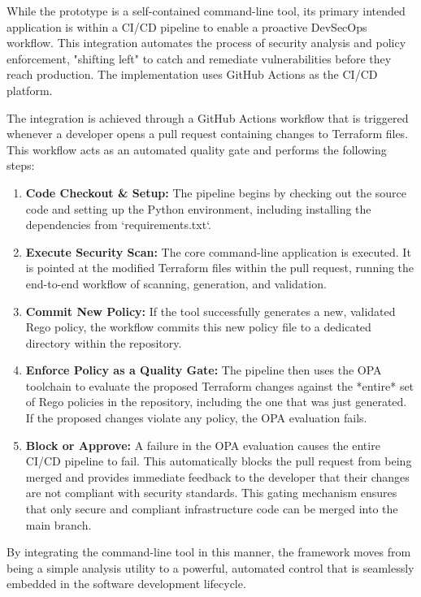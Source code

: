 While the prototype is a self-contained command-line tool, its primary intended application is within a CI/CD pipeline to enable a proactive DevSecOps workflow. This integration automates the process of security analysis and policy enforcement, "shifting left" to catch and remediate vulnerabilities before they reach production. The implementation uses GitHub Actions as the CI/CD platform.

The integration is achieved through a GitHub Actions workflow that is triggered whenever a developer opens a pull request containing changes to Terraform files. This workflow acts as an automated quality gate and performs the following steps:

\begin{enumerate}
    \item \textbf{Code Checkout \& Setup:} The pipeline begins by checking out the source code and setting up the Python environment, including installing the dependencies from `requirements.txt`.
    \item \textbf{Execute Security Scan:} The core command-line application is executed. It is pointed at the modified Terraform files within the pull request, running the end-to-end workflow of scanning, generation, and validation.
    \item \textbf{Commit New Policy:} If the tool successfully generates a new, validated Rego policy, the workflow commits this new policy file to a dedicated directory within the repository.
    \item \textbf{Enforce Policy as a Quality Gate:} The pipeline then uses the OPA toolchain to evaluate the proposed Terraform changes against the *entire* set of Rego policies in the repository, including the one that was just generated. If the proposed changes violate any policy, the OPA evaluation fails.
    \item \textbf{Block or Approve:} A failure in the OPA evaluation causes the entire CI/CD pipeline to fail. This automatically blocks the pull request from being merged and provides immediate feedback to the developer that their changes are not compliant with security standards. This gating mechanism ensures that only secure and compliant infrastructure code can be merged into the main branch.
\end{enumerate}

By integrating the command-line tool in this manner, the framework moves from being a simple analysis utility to a powerful, automated control that is seamlessly embedded in the software development lifecycle.

